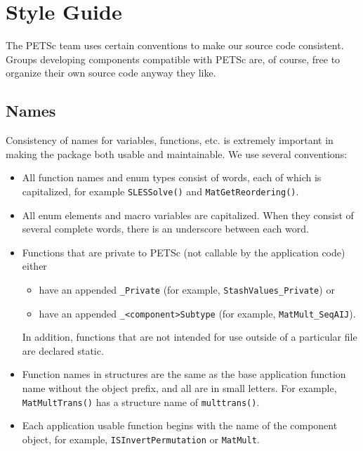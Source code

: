 \chapter{Style Guide}

The PETSc team uses certain conventions to make our source code consistent. Groups
developing components compatible with PETSc are, of course, free to organize their
own source code anyway they like.

\section{Names}
Consistency of names for variables, functions, etc. is extremely 
important in making the package both usable and maintainable.
We use several conventions:
\begin{itemize}
\item All function names and enum types consist of words, each of 
      which is capitalized, for example {\tt SLESSolve()} and 
      {\tt MatGetReordering()}.
\item All enum elements and macro variables are capitalized. When
      they consist of several
      complete words, there is an underscore between each word.
\item Functions that are private to PETSc (not callable by the 
      application code) either
      \begin{itemize}
        \item have an appended {\tt \_Private} (for example, 
           {\tt StashValues\_Private}) or
        \item have an appended {\tt \_<component>Subtype} (for example,
           {\tt MatMult\_SeqAIJ}).
      \end{itemize}

      In addition, functions that are not intended for use outside
      of a particular file are declared static.
\item Function names in structures are the same as the base application
      function name without the object prefix, and all are in small letters. 
      For example, {\tt MatMultTrans()} has a structure name of 
      {\tt multtrans()}.
\item Each application usable function begins with the name of the component object, 
      for example, {\tt ISInvertPermutation} or {\tt MatMult}. 
\end{itemize}

